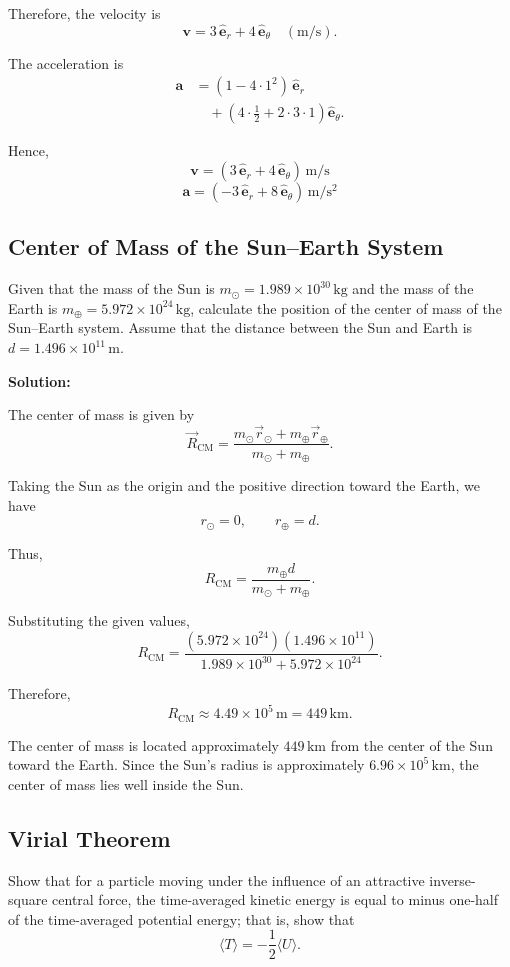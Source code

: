 \documentclass[12pt]{article}
\begin{document}
Therefore, the velocity is
\[
\mathbf{v}
= 3\,\hat{\mathbf{e}}_r
+ 4\,\hat{\mathbf{e}}_\theta
\quad (\mathrm{m/s}).
\]

The acceleration is
\begin{align*}
\mathbf{a}
&= (1 - 4\cdot 1^2)\,\hat{\mathbf{e}}_r \\
&\quad + \left(4\cdot\frac{1}{2}
+ 2\cdot 3\cdot 1\right)\hat{\mathbf{e}}_\theta.
\end{align*}

Hence,
\[
\boxed{
\mathbf{v}
= (3\,\hat{\mathbf{e}}_r
+ 4\,\hat{\mathbf{e}}_\theta)\,\mathrm{m/s}
}
\]
\[
\boxed{
\mathbf{a}
= (-3\,\hat{\mathbf{e}}_r
+ 8\,\hat{\mathbf{e}}_\theta)\,\mathrm{m/s^2}
}
\]



\subsection{Center of Mass of the Sun--Earth System}

Given that the mass of the Sun is
\(m_\odot = 1.989 \times 10^{30}\,\mathrm{kg}\)
and the mass of the Earth is
\(m_\oplus = 5.972 \times 10^{24}\,\mathrm{kg}\),
calculate the position of the center of mass of the Sun--Earth system.
Assume that the distance between the Sun and Earth is
\(d = 1.496 \times 10^{11}\,\mathrm{m}\).

\textbf{Solution:}

The center of mass is given by
\[
\vec{R}_{\mathrm{CM}} =
\frac{m_\odot \vec{r}_\odot + m_\oplus \vec{r}_\oplus}
{m_\odot + m_\oplus}.
\]

Taking the Sun as the origin and the positive direction toward
the Earth, we have
\[
r_\odot = 0, \qquad r_\oplus = d.
\]

Thus,
\[
R_{\mathrm{CM}} =
\frac{m_\oplus d}{m_\odot + m_\oplus}.
\]

Substituting the given values,
\[
R_{\mathrm{CM}} =
\frac{(5.972 \times 10^{24})(1.496 \times 10^{11})}
{1.989 \times 10^{30} + 5.972 \times 10^{24}}.
\]

Therefore,
\[
\boxed{
R_{\mathrm{CM}} \approx 4.49 \times 10^5\,\mathrm{m}
= 449\,\mathrm{km}.
}
\]

The center of mass is located approximately \(449\,\mathrm{km}\)
from the center of the Sun toward the Earth. Since the Sun's radius
is approximately \(6.96 \times 10^5\,\mathrm{km}\), the center of
mass lies well inside the Sun.

\subsection{Virial Theorem}
Show that for a particle moving under the influence of an attractive inverse-square central force, the time-averaged kinetic energy is equal to minus one-half of the time-averaged potential energy; that is, show that
\[
\langle T \rangle = -\frac{1}{2}\langle U \rangle.
\]
\end{document}
